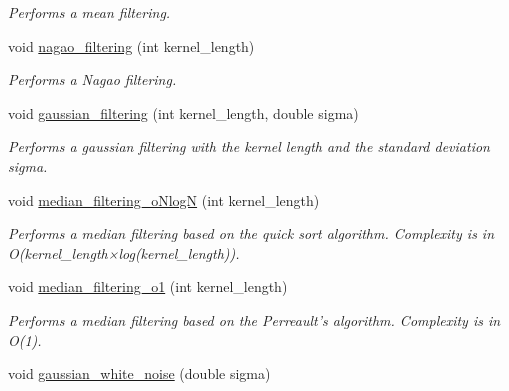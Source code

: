 \begin{DoxyCompactItemize}
\begin{DoxyCompactList}\small\item\em Performs a mean filtering. \end{DoxyCompactList}\item 
\hypertarget{classofeli_1_1_filters_ac34d1b5157e16d92176acc0548f62ff3}{void \hyperlink{classofeli_1_1_filters_ac34d1b5157e16d92176acc0548f62ff3}{nagao\-\_\-filtering} (int kernel\-\_\-length)}\label{classofeli_1_1_filters_ac34d1b5157e16d92176acc0548f62ff3}

\begin{DoxyCompactList}\small\item\em Performs a Nagao filtering. \end{DoxyCompactList}\item 
\hypertarget{classofeli_1_1_filters_a22c697b23c38bc3122975e3b923d2bf2}{void \hyperlink{classofeli_1_1_filters_a22c697b23c38bc3122975e3b923d2bf2}{gaussian\-\_\-filtering} (int kernel\-\_\-length, double sigma)}\label{classofeli_1_1_filters_a22c697b23c38bc3122975e3b923d2bf2}

\begin{DoxyCompactList}\small\item\em Performs a gaussian filtering with the kernel length and the standard deviation {\ttfamily sigma}. \end{DoxyCompactList}\item 
\hypertarget{classofeli_1_1_filters_a2dff0282c738fff489f18d9173cfec24}{void \hyperlink{classofeli_1_1_filters_a2dff0282c738fff489f18d9173cfec24}{median\-\_\-filtering\-\_\-o\-Nlog\-N} (int kernel\-\_\-length)}\label{classofeli_1_1_filters_a2dff0282c738fff489f18d9173cfec24}

\begin{DoxyCompactList}\small\item\em Performs a median filtering based on the quick sort algorithm. Complexity is in {\ttfamily O}(kernel\-\_\-length×log(kernel\-\_\-length)). \end{DoxyCompactList}\item 
\hypertarget{classofeli_1_1_filters_a65e7324360cac62a715a61565399ad85}{void \hyperlink{classofeli_1_1_filters_a65e7324360cac62a715a61565399ad85}{median\-\_\-filtering\-\_\-o1} (int kernel\-\_\-length)}\label{classofeli_1_1_filters_a65e7324360cac62a715a61565399ad85}

\begin{DoxyCompactList}\small\item\em Performs a median filtering based on the Perreault's algorithm. Complexity is in {\ttfamily O(1)}. \end{DoxyCompactList}\item 
\hypertarget{classofeli_1_1_filters_a0351b099fb22a9397b27ae1661b6c836}{void \hyperlink{classofeli_1_1_filters_a0351b099fb22a9397b27ae1661b6c836}{gaussian\-\_\-white\-\_\-noise} (double sigma)}\label{classofeli_1_1_filters_a0351b099fb22a9397b27ae1661b6c836}


\end{DoxyCompactItemize}
